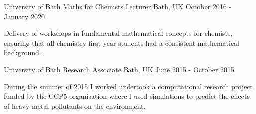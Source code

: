 \begin{cventries}
  \cventry   
    {University of Bath}    
    {Maths for Chemists Lecturer}
    {Bath, UK}
    {October 2016 - January 2020}
    {
      \begin{cvitems}
        \item
        {Delivery of workshops in fundamental mathematical concepts for chemists, ensuring that all chemistry first year students had a consistent mathematical background.} 
      \end{cvitems}
    }
    \cventry
    {University of Bath}
    {Research Associate}
    {Bath, UK}
    {June 2015 - October 2015}
    {
      \begin{cvitems}
        \item {During the summer of 2015 I worked undertook a computational research project funded by the CCP5 organisation where I used simulations to predict the effects of heavy metal pollutants on the environment.}
      \end{cvitems}
    }
\end{cventries}

